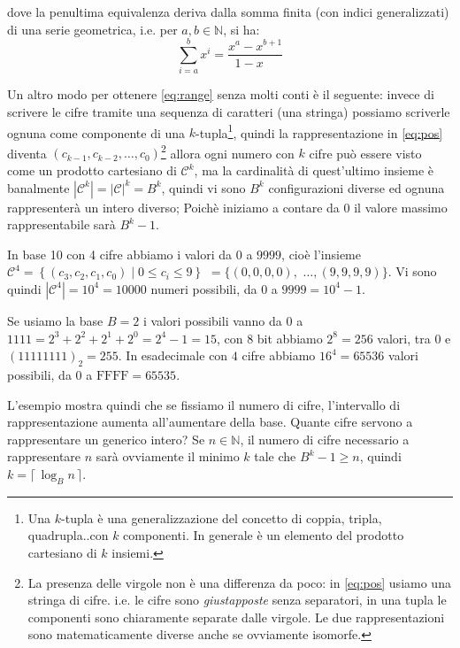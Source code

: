 \noindent dove la penultima equivalenza deriva dalla somma finita (con indici
generalizzati) di una serie geometrica, i.e. per $a,b \in \mathbb{N}$, si ha:
\[ \sum_{i=a}^{b} x^i = \frac{x^a-x^{b+1}}{1-x\quad} \]

Un altro modo  per
ottenere \eqref{eq:range} senza molti conti è il seguente: invece di scrivere
le cifre tramite una sequenza di caratteri (una stringa) possiamo scriverle
ognuna come componente di una $k$-tupla\footnote{Una $k$-tupla è una
generalizzazione del concetto di coppia, tripla, quadrupla..con $k$ componenti.
In generale è un elemento del prodotto cartesiano di $k$ insiemi.}, quindi la rappresentazione in \eqref{eq:pos} diventa $(c_{k-1}, c_{k-2}, \ldots,
c_0)$\footnote{La presenza delle virgole non è una differenza da poco: in
\eqref{eq:pos} usiamo una stringa di cifre. i.e. le cifre sono
\emph{giustapposte} senza separatori, in una tupla le componenti sono
chiaramente separate dalle virgole. Le due rappresentazioni sono
matematicamente diverse anche se ovviamente isomorfe.} allora ogni numero con
$k$ cifre può essere visto come un prodotto cartesiano di $\mathcal{C}^k$, ma
la cardinalità di quest'ultimo insieme è banalmente $|\mathcal{C}^k| =
|\mathcal{C}|^k = B^k$, quindi vi sono $B^k$ configurazioni
diverse ed ognuna rappresenterà un intero diverso; Poichè iniziamo
a contare da $0$ il valore massimo rappresentabile sarà $B^k-1$.

\begin{ex} In base 10 con 4 cifre abbiamo i valori da
$0$ a $9999$, cioè l'insieme $\mathcal{C}^4 =
\left\{ (c_3,c_2,c_1,c_0) \;|\; 0 \leq c_i \leq 9 \right\}$ $= \{
(0,0,0,0),$ $\ldots, (9,9,9,9) \}$. Vi sono quindi $|\mathcal{C}^4| = 10^4 = 10000$
numeri possibili, da $0$ a $9999 = 10^4-1$.\medskip

Se usiamo la base $B = 2$ i valori possibili vanno da $0$ a $1111 =
2^3+2^2+2^1+2^0 = 2^4-1 = 15$, con $8$ bit abbiamo $2^8 = 256$ valori, tra $0$
e $(11111111)_2 = 255$. In esadecimale con $4$ cifre abbiamo $16^4 = 65536$ valori possibili, da $0$ a $\text{FFFF} = 65535$. 
\end{ex}

L'esempio
mostra quindi che se fissiamo il numero di cifre, l'intervallo di rappresentazione aumenta all'aumentare della base. Quante cifre servono a rappresentare un generico intero? Se $n \in \mathbb{N}$, il numero di cifre necessario a rappresentare $n$ sarà ovviamente il minimo $k$ tale che $B^k-1 \geq n$, quindi $k = \lceil\, \log_B{n} \,\rceil$.

